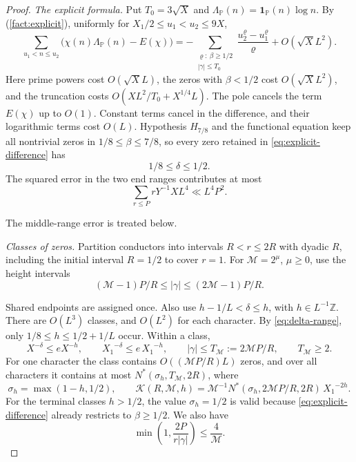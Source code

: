 \documentclass{amsart}
\newcounter{fact}
\numberwithin{equation}{section}
\numberwithin{table}{section}
\newcommand{\Z}{\mathbb Z}
\newcommand{\PP}{\mathbb P}
\newcommand{\ind}{\mathbf 1}
\begin{document}
\begin{proof}
\noindent\textit{The explicit formula.}
Put $T_0=3\sqrt X$ and $\Lambda_\PP(n)=\ind_\PP(n)\log n$. By (\ref{fact:explicit}), uniformly for $X_1/2\le u_1<u_2\le9X$,
\begin{equation}\label{eq:explicit-difference}
\sum_{u_1<n\le u_2}\bigl(\chi(n)\Lambda_\PP(n)-E(\chi)\bigr)
=-\sum_{\substack{\varrho:\ \beta\ge1/2\\|\gamma|\le T_0}}
\frac{u_2^\varrho-u_1^\varrho}{\varrho}
+O(\sqrt X L^2).
\end{equation}
Here prime powers cost $O(\sqrt XL)$, the zeros with $\beta<1/2$ cost
$O(\sqrt XL^2)$, and the truncation costs $O(XL^2/T_0+X^{1/4}L)$.
The pole cancels the term $E(\chi)$ up to $O(1)$. Constant terms cancel
in the difference, and their logarithmic terms cost $O(L)$.
Hypothesis $H_{7/8}$ and the functional equation keep all nontrivial zeros
in $1/8\le\beta\le7/8$, so every zero retained in \eqref{eq:explicit-difference} has
\begin{equation}\label{eq:delta-range}
1/8\le\delta\le1/2.
\end{equation}
The squared error in the two end ranges contributes at most
\[
\sum_{r\le P}rY^{-1}XL^4\ll L^4P^2.
\]

The middle-range error is treated below.

\noindent\textit{Classes of zeros.}
Partition conductors into intervals $R<r\le2R$ with dyadic $R$,
including the initial interval $R=1/2$ to cover $r=1$. For $\mathcal M=2^\mu$, $\mu\ge0$, use the height intervals
\[
(\mathcal M-1)P/R\le |\gamma|\le(2\mathcal M-1)P/R.
\]

Shared endpoints are assigned once.
Also use $h-1/L<\delta\le h$, with $h\in L^{-1}\Z$.
There are $O(L^3)$ classes, and $O(L^2)$ for each character. By \eqref{eq:delta-range}, only $1/8\le h\le1/2+1/L$ occur.
Within a class,
\[
X^{-\delta}\le eX^{-h},\qquad {X_1}^{-\delta}\le e\,{X_1}^{-h},
\qquad |\gamma|\le T_{\mathcal M}:=2\mathcal MP/R,
\qquad T_{\mathcal M}\ge2.
\]
For one character the class contains $O((\mathcal MP/R)L)$ zeros, and
over all characters it contains at most
$N^*(\sigma_h,T_{\mathcal M},2R)$, where
\begin{equation}\label{eq:class-K}
\sigma_h=\max(1-h,1/2),\qquad
\mathcal K(R,\mathcal M,h)
=\mathcal M^{-1}N^*(\sigma_h,2\mathcal MP/R,2R)\,{X_1}^{-2h}.
\end{equation}
For the terminal classes $h>1/2$, the value $\sigma_h=1/2$ is valid
because \eqref{eq:explicit-difference} already restricts to $\beta\ge1/2$.
We also have
\begin{equation}\label{eq:height-decay}
\min\left(1,\frac{2P}{r|\gamma|}\right)\le\frac4{\mathcal M}.
\end{equation}


\end{proof}
\end{document}

